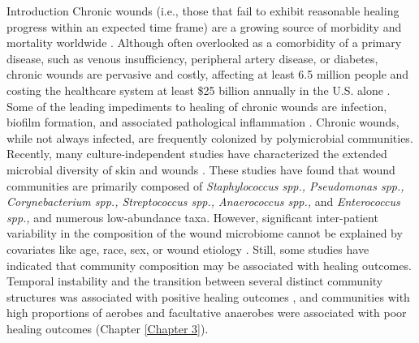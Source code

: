 \documentclass[oneside,12pt,final]{sty/ucthesis-CA2012}
\begin{document}
\begin{mainmatter}
\begin{section}{Introduction}
Chronic wounds (i.e., those that fail to exhibit reasonable healing progress within an expected time frame) are a growing source of morbidity and mortality worldwide \cite{RN2, RN3}. Although often overlooked as a comorbidity of a primary disease, such as venous insufficiency, peripheral artery disease, or diabetes, chronic wounds are pervasive and costly, affecting at least 6.5 million people and costing the healthcare system at least \$25 billion annually in the U.S. alone \cite{RN2, RN3, RN4}. Some of the leading impediments to healing of chronic wounds are infection, biofilm formation, and associated pathological inflammation \cite{RN5}. Chronic wounds, while not always infected, are frequently colonized by polymicrobial communities. Recently, many culture-independent studies have characterized the extended microbial diversity of skin and wounds \cite{RN6, RN7, RN8, RN9, RN10, RN11, RN12, RN13, RN14, RN15, RN16, RN17, RN18, RN19, RN20, RN21, RN22, RN23, RN24, RN25, RN26, RN27, RN28}. These studies have found that wound communities are primarily composed of \textit{Staphylococcus spp., Pseudomonas spp., Corynebacterium spp., Streptococcus spp., Anaerococcus spp.,} and \textit{Enterococcus spp.,} and numerous low-abundance taxa. However, significant inter-patient variability in the composition of the wound microbiome cannot be explained by covariates like age, race, sex, or wound etiology \cite{RN6, RN10}. Still, some studies have indicated that community composition may be associated with healing outcomes. Temporal instability and the transition between several distinct community structures was associated with positive healing outcomes \cite{RN7}, and communities with high proportions of aerobes and facultative anaerobes were associated with poor healing outcomes (Chapter \ref{Chapter 3}).


\end{section}
\end{mainmatter}
\end{document}
